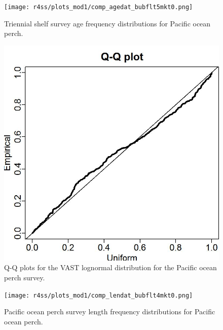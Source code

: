 \documentclass[12pt,]{article}
\begin{document}
\FloatBarrier

\begin{figure}
\centering
\texttt{[image: r4ss/plots\_mod1/comp\_agedat\_bubflt5mkt0.png]}
\caption{Triennial shelf survey age frequency distributions for Pacific
ocean perch. \label{fig:Tri_Age}}
\end{figure}

\FloatBarrier

\begin{figure}
\centering
\includegraphics{Figures/Q-Q_plot_pop.jpg}
\caption{Q-Q plots for the VAST lognormal distribution for the Pacific
ocean perch survey. \label{fig:pop_qq}}
\end{figure}

\FloatBarrier

\begin{figure}
\centering
\texttt{[image: r4ss/plots\_mod1/comp\_lendat\_bubflt4mkt0.png]}
\caption{Pacific ocean perch survey length frequency distributions for
Pacific ocean perch. \label{fig:POP_Length}}
\end{figure}

\FloatBarrier
\end{document}
